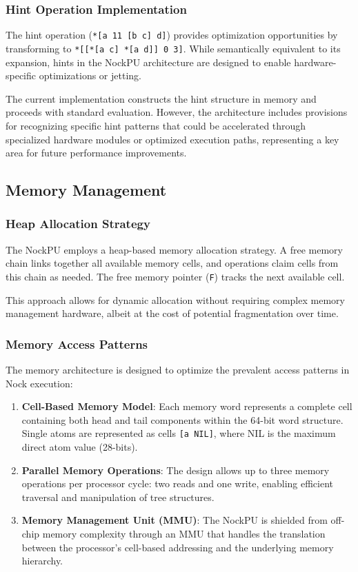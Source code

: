 \documentclass[twoside]{article}
\begin{document}
\subsubsection{Hint Operation Implementation}

The hint operation (\texttt{*[a 11 [b c] d]}) provides optimization opportunities by transforming to \texttt{*[[*[a c] *[a d]] 0 3]}. While semantically equivalent to its expansion, hints in the NockPU architecture are designed to enable hardware-specific optimizations or jetting.

The current implementation constructs the hint structure in memory and proceeds with standard evaluation. However, the architecture includes provisions for recognizing specific hint patterns that could be accelerated through specialized hardware modules or optimized execution paths, representing a key area for future performance improvements.

\subsection{Memory Management}

\subsubsection{Heap Allocation Strategy}

The NockPU employs a heap-based memory allocation strategy. A free memory chain links together all available memory cells, and operations claim cells from this chain as needed. The free memory pointer (\texttt{F}) tracks the next available cell.

This approach allows for dynamic allocation without requiring complex memory management hardware, albeit at the cost of potential fragmentation over time.

\subsubsection{Memory Access Patterns}

The memory architecture is designed to optimize the prevalent access patterns in Nock execution:

\begin{enumerate}
  \item \textbf{Cell-Based Memory Model}: Each memory word represents a complete cell containing both head and tail components within the 64-bit word structure. Single atoms are represented as cells \texttt{[a NIL]}, where NIL is the maximum direct atom value (28-bits).
  \item \textbf{Parallel Memory Operations}: The design allows up to three memory operations per processor cycle: two reads and one write, enabling efficient traversal and manipulation of tree structures.
  \item \textbf{Memory Management Unit (MMU)}: The NockPU is shielded from off-chip memory complexity through an MMU that handles the translation between the processor's cell-based addressing and the underlying memory hierarchy.
\end{enumerate}
\end{document}
